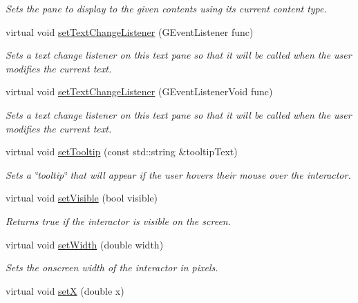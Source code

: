 \begin{DoxyCompactItemize}
\begin{DoxyCompactList}\small\item\em Sets the pane to display to the given contents using its current content type. \end{DoxyCompactList}\item 
virtual void \mbox{\hyperlink{classGBrowserPane_ae41284f9c540110180ac0ad6beca5cb0}{set\+Text\+Change\+Listener}} (G\+Event\+Listener func)
\begin{DoxyCompactList}\small\item\em Sets a text change listener on this text pane so that it will be called when the user modifies the current text. \end{DoxyCompactList}\item 
virtual void \mbox{\hyperlink{classGBrowserPane_ae8df75b0746951146d29220f386fcd33}{set\+Text\+Change\+Listener}} (G\+Event\+Listener\+Void func)
\begin{DoxyCompactList}\small\item\em Sets a text change listener on this text pane so that it will be called when the user modifies the current text. \end{DoxyCompactList}\item 
virtual void \mbox{\hyperlink{classGInteractor_a039e0e49beaecc275efce02d416acea8}{set\+Tooltip}} (const std\+::string \&tooltip\+Text)
\begin{DoxyCompactList}\small\item\em Sets a \char`\"{}tooltip\char`\"{} that will appear if the user hovers their mouse over the interactor. \end{DoxyCompactList}\item 
virtual void \mbox{\hyperlink{classGInteractor_a18e44e30b31525a243960ca3928125aa}{set\+Visible}} (bool visible)
\begin{DoxyCompactList}\small\item\em Returns true if the interactor is visible on the screen. \end{DoxyCompactList}\item 
virtual void \mbox{\hyperlink{classGInteractor_aa3f3fba4cb131baa8696ba01e3bceca1}{set\+Width}} (double width)
\begin{DoxyCompactList}\small\item\em Sets the onscreen width of the interactor in pixels. \end{DoxyCompactList}\item 
virtual void \mbox{\hyperlink{classGInteractor_a9c18fcc579333bf9653d13ad2b372e39}{setX}} (double x)

\end{DoxyCompactItemize}
